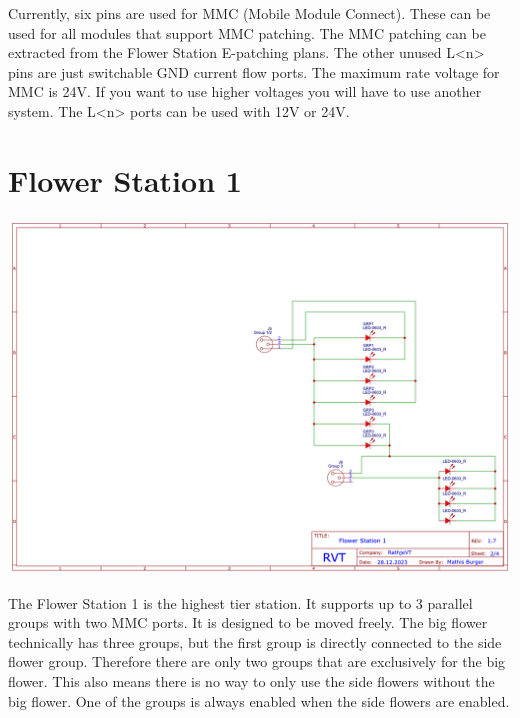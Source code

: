 \documentclass[10pt]{datasheet}
\begin{document}
Currently, six pins are used for MMC (Mobile Module Connect). These can be used for all modules that support MMC patching.
The MMC patching can be extracted from the Flower Station E-patching plans. The other unused L<n> pins are just switchable GND current flow ports.
The maximum rate voltage for MMC is 24V. If you want to use higher voltages you will have to use another system. The L<n> ports can be used with 12V or 24V.

\pagebreak

\section{Flower Station 1}

\includegraphics[scale=0.4]{Flower Station 1.png}

The Flower Station 1 is the highest tier station. It supports up to 3 parallel groups with two MMC ports. It is designed to be moved freely.
The big flower technically has three groups, but the first group is directly connected to the side flower group. Therefore there are only two groups
that are exclusively for the big flower. This also means there is no way to only use the side flowers without the big flower. One of the groups is always enabled
when the side flowers are enabled.
\end{document}
